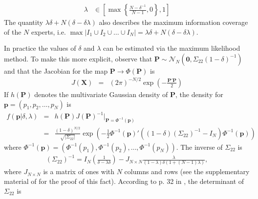 \documentclass[11pt,twoside]{article}
\theoremstyle{definition}
\theoremstyle{definition}
\begin{document}
\begin{align}
\lambda &\in \left[  \max \left\{ \frac{N-\delta^{-1}}{N-1}, 0\right\}, 1 \right] \label{rhoDomain}
\end{align}
The quantity  $\lambda\delta + N(\delta - \delta\lambda)$ also describes the maximum information coverage of the $N$ experts, i.e. $\max | I_1 \cup I_2 \cup \dots \cup I_N| = \lambda\delta + N(\delta - \delta\lambda)$. 

In practice the values of $\delta$ and $\lambda$ can be estimated via the maximum likelihood method. To make this more explicit, observe that $\boldsymbol{P} \sim \mathcal{N}_N\left(\boldsymbol{0}, \Sigma_{22} (1-\delta)^{-1}\right)$ and that the Jacobian for the map $\boldsymbol{P} \to \Phi\left(\boldsymbol{P}\right)$ is
\begin{eqnarray*}
J(\boldsymbol{X}) &=& (2\pi)^{-N/2} \exp \left( - \frac{\boldsymbol{P}' \boldsymbol{P}}{2}   \right) 
\end{eqnarray*}
If $h(\boldsymbol{P})$ denotes the multivariate Gaussian density of $\boldsymbol{P}$,  
the density for  $\boldsymbol{p} = (p_1, p_2, \dots, p_N)$ is 
\begin{eqnarray*}
 f\left(\boldsymbol{p} | \delta, \lambda \right) &=& h(\boldsymbol{P}) J(\boldsymbol{P})^{-1} \bigg|_{\boldsymbol{P} = \Phi^{-1}(\boldsymbol{p})}\\
&=& \frac{(1-\delta)^{N/2}}{\sqrt{ \left|\Sigma_{22}\right|}} \exp\left( -\frac{1}{2} \Phi^{-1}(\boldsymbol{p})' \left( (1-\delta) \left(\Sigma_{22}\right)^{-1} - I_N \right) \Phi^{-1}(\boldsymbol{p})  \right) 
\end{eqnarray*}
where $\Phi^{-1}(\boldsymbol{p}) =  (\Phi^{-1}(p_1), \Phi^{-1}(p_2), \dots, \Phi^{-1}(p_N))$. 
The inverse of $\Sigma_{22}$  is
\begin{align}
\left(\Sigma_{22}\right)^{-1} = I_N \left(\frac{1}{\delta-\lambda\delta} \right) - J_{N \times N} \frac{\lambda}{(1-\lambda)\delta(1+(N-1) \lambda)} \label{inverse},
\end{align}
where $J_{N \times N}$ is a matrix of ones with $N$ columns and rows (see the supplementary material of \cite{dobbin2005sample} for the proof of this fact).  According to p. 32 in \cite{rao2009linear}, the determinant of $\Sigma_{22}$ is
\end{document}
